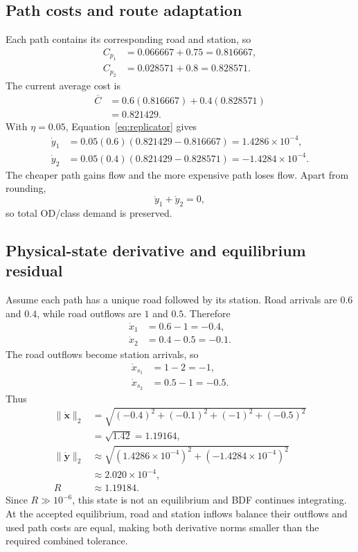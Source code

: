 \documentclass[11pt]{article}
\begin{document}
\subsection*{Path costs and route adaptation}

Each path contains its corresponding road and station, so
\begin{align}
    C_{p_1}&=0.066667+0.75=0.816667,\\
    C_{p_2}&=0.028571+0.8=0.828571.
\end{align}
The current average cost is
\begin{align}
    \overline C
    &=0.6(0.816667)+0.4(0.828571)\\
    &=0.821429.
\end{align}
With $\eta=0.05$, Equation~\eqref{eq:replicator} gives
\begin{align}
    \dot y_1
    &=0.05(0.6)(0.821429-0.816667)
      =1.4286\times10^{-4},\\
    \dot y_2
    &=0.05(0.4)(0.821429-0.828571)
      =-1.4284\times10^{-4}.
\end{align}
The cheaper path gains flow and the more expensive path loses flow. Apart from
rounding,
\begin{equation}
    \dot y_1+\dot y_2=0,
\end{equation}
so total OD/class demand is preserved.

\subsection*{Physical-state derivative and equilibrium residual}

Assume each path has a unique road followed by its station. Road arrivals are
$0.6$ and $0.4$, while road outflows are $1$ and $0.5$. Therefore
\begin{align}
    \dot x_1&=0.6-1=-0.4,\\
    \dot x_2&=0.4-0.5=-0.1.
\end{align}
The road outflows become station arrivals, so
\begin{align}
    \dot x_{s_1}&=1-2=-1,\\
    \dot x_{s_2}&=0.5-1=-0.5.
\end{align}
Thus
\begin{align}
    \|\dot{\mathbf x}\|_2
    &=\sqrt{(-0.4)^2+(-0.1)^2+(-1)^2+(-0.5)^2}\\
    &=\sqrt{1.42}=1.19164,\\
    \|\dot{\mathbf y}\|_2
    &\approx\sqrt{(1.4286\times10^{-4})^2
                   +(-1.4284\times10^{-4})^2}\\
    &\approx2.020\times10^{-4},\\
    R&\approx1.19184.
\end{align}
Since $R\gg10^{-6}$, this state is not an equilibrium and BDF continues
integrating. At the accepted equilibrium, road and station inflows balance
their outflows and used path costs are equal, making both derivative norms
smaller than the required combined tolerance.
\end{document}
